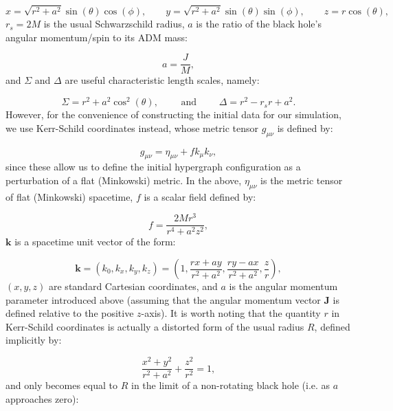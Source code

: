 \documentclass{article}
\begin{document}
\begin{equation}
x = \sqrt{r^2 + a^2} \sin \left( \theta \right) \cos \left( \phi \right), \qquad y = \sqrt{r^2 + a^2} \sin \left( \theta \right) \sin \left( \phi \right), \qquad z = r \cos \left( \theta \right),
\end{equation}
${r_s = 2 M}$ is the usual Schwarzschild radius, $a$ is the ratio of the black hole's angular momentum/spin to its ADM mass:

\begin{equation}
a = \frac{J}{M},
\end{equation}
and ${\Sigma}$ and ${\Delta}$ are useful characteristic length scales, namely:

\begin{equation}
\Sigma = r^2 + a^2 \cos^2 \left( \theta \right), \qquad \text{ and } \qquad \Delta = r^2 - r_s r + a^2.
\end{equation}
However, for the convenience of constructing the initial data for our simulation, we use Kerr-Schild coordinates instead\cite{debney}\cite{balasin}, whose metric tensor ${g_{\mu \nu}}$ is defined by:

\begin{equation}
g_{\mu \nu} = \eta_{\mu \nu} + f k_{\mu} k_{\nu},
\end{equation}
since these allow us to define the initial hypergraph configuration as a perturbation of a flat (Minkowski) metric. In the above, ${\eta_{\mu \nu}}$ is the metric tensor of flat (Minkowski) spacetime, $f$ is a scalar field defined by:

\begin{equation}
f = \frac{2 M r^3}{r^4 + a^2 z^2},
\end{equation}
${\mathbf{k}}$ is a spacetime unit vector of the form:

\begin{equation}
\mathbf{k} = \left( k_0, k_x, k_y, k_z \right) = \left( 1, \frac{rx + ay}{r^2 + a^2}, \frac{ry - ax}{r^2 + a^2}, \frac{z}{r} \right),
\end{equation}
${\left( x, y, z \right)}$ are standard Cartesian coordinates, and $a$ is the angular momentum parameter introduced above (assuming that the angular momentum vector ${\mathbf{J}}$ is defined relative to the positive $z$-axis). It is worth noting that the quantity $r$ in Kerr-Schild coordinates is actually a distorted form of the usual radius $R$, defined implicitly by:

\begin{equation}
\frac{x^2 + y^2}{r^2 + a^2} + \frac{z^2}{r^2} = 1,
\end{equation}
and only becomes equal to $R$ in the limit of a non-rotating black hole (i.e. as $a$ approaches zero):
\end{document}
